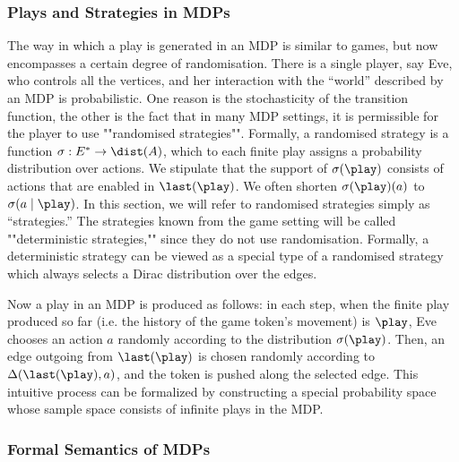 \subsubsection*{Plays and Strategies in MDPs}


 The way in which a play is generated in an MDP is similar to games, but now encompasses a certain degree of randomisation. There is a single player, say Eve, who controls all the vertices, and her interaction with the ``world'' described by an MDP is probabilistic. One reason is the stochasticity of the transition function, the other is the fact that in many MDP settings, it is permissible for the player to use ""randomised strategies"". Formally, a randomised strategy is a function $\sigma : E^* \to \dist(A)$, which to each finite play assigns a probability distribution over actions. We stipulate that the support of $\sigma(\play)$ consists of actions that are enabled in $\last(\play)$. We often shorten $\sigma(\play)(a)$ to $\sigma(a\mid \play)$.
%
In this section, we will refer to randomised strategies simply as ``strategies.'' The strategies known from the game setting will be called  ""deterministic strategies,"" since they do not use randomisation. Formally, a deterministic strategy can be viewed as a special type of a randomised strategy which always selects a Dirac distribution over the edges.

Now a play in an MDP is produced as follows: in each step, when the finite play produced so far (i.e. the history of the game token's movement) is $\play$, Eve chooses an action $a$ randomly according to the distribution $\sigma(\play)$. Then, an edge outgoing from $\last(\play)$ is chosen randomly according to $\probTranFunc(\last(\play),a)$, and the token is pushed along the selected edge. This intuitive process can be formalized by constructing a special probability space whose sample space consists of infinite plays in the MDP. 




\subsubsection*{Formal Semantics of MDPs}

